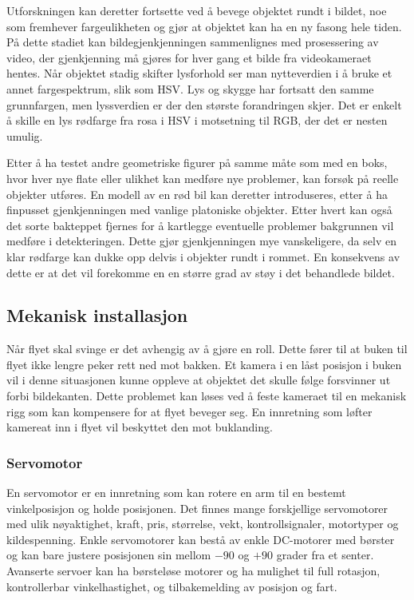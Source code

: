 Utforskningen kan deretter fortsette ved å bevege objektet rundt i bildet, noe som fremhever fargeulikheten og gjør at objektet kan ha en ny fasong hele tiden. På dette stadiet kan bildegjenkjenningen sammenlignes med prosessering av video, der gjenkjenning må gjøres for hver gang et bilde fra videokameraet hentes. Når objektet stadig skifter lysforhold ser man nytteverdien i å bruke et annet fargespektrum, slik som HSV. Lys og skygge har fortsatt den samme grunnfargen, men lyssverdien er der den største forandringen skjer. Det er enkelt å skille en lys rødfarge fra rosa i HSV i motsetning til RGB, der det er nesten umulig. 

Etter å ha testet andre geometriske figurer på samme måte som med en boks, hvor hver nye flate eller ulikhet kan medføre nye problemer, kan forsøk på reelle objekter utføres. En modell av en rød bil kan deretter introduseres, etter å ha finpusset gjenkjenningen med vanlige platoniske objekter. Etter hvert kan også det sorte bakteppet fjernes for å kartlegge eventuelle problemer bakgrunnen vil medføre i detekteringen. Dette gjør gjenkjenningen mye vanskeligere, da selv en klar rødfarge kan dukke opp delvis i objekter rundt i rommet. En konsekvens av dette er at det vil forekomme en en større grad av støy i det behandlede bildet.  

\subsection{Mekanisk installasjon}
Når flyet skal svinge er det avhengig av å gjøre en roll. Dette fører til at buken til flyet ikke lengre peker rett ned mot bakken. Et kamera i en låst posisjon i buken vil i denne situasjonen kunne oppleve at objektet det skulle følge forsvinner ut forbi bildekanten. Dette problemet kan løses ved å feste kameraet til en mekanisk rigg som kan kompensere for at flyet beveger seg. En innretning som løfter kamereat inn i flyet vil beskyttet den mot buklanding. 


\subsubsection{Servomotor}

En servomotor er en innretning som kan rotere en arm til en bestemt vinkelposisjon og holde posisjonen. Det finnes mange forskjellige servomotorer med ulik nøyaktighet, kraft, pris, størrelse, vekt, kontrollsignaler, motortyper og kildespenning. Enkle servomotorer kan bestå av enkle DC-motorer med børster og kan bare justere posisjonen sin mellom $-90$ og $+90$ grader fra et senter. Avanserte servoer kan ha børsteløse motorer og ha mulighet til full rotasjon, kontrollerbar vinkelhastighet, og tilbakemelding av posisjon og fart.

